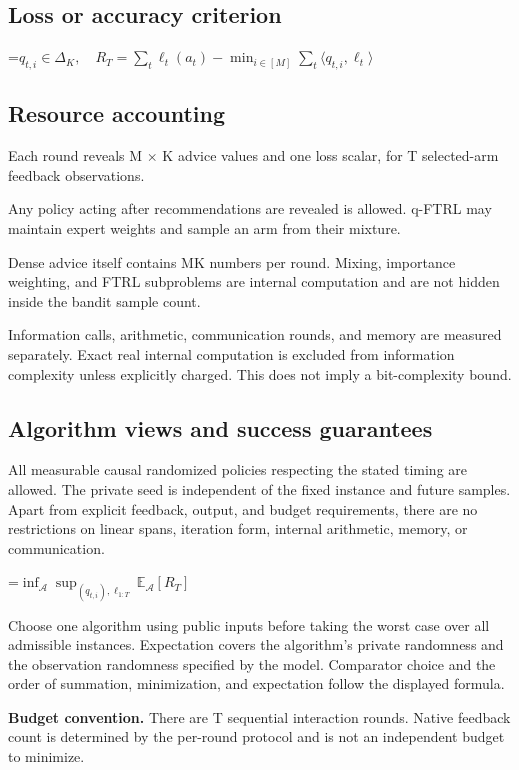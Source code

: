 \documentclass[10pt,a4paper]{article}
\newcommand{\AtlasMath}[1]{\par\begingroup\centering\setbox0=\hbox{$\displaystyle #1$}\ifdim\wd0>1.4\linewidth\typeout{ATLAS WIDE FORMULA: \the\wd0}\fi\ifdim\wd0>\linewidth\resizebox{\linewidth}{!}{\box0}\else\box0\fi\par\endgroup}
\begin{document}
\subsection{Loss or accuracy criterion}

\AtlasMath{q_{t,i}\in\Delta_K,\quad R_T=\sum_t\ell_t(a_t)-\min_{i\in[M]}\sum_t\langle q_{t,i},\ell_t\rangle}


\subsection{Resource accounting}
Each round reveals M $\times$ K advice values and one loss scalar, for T selected-arm feedback observations.

Any policy acting after recommendations are revealed is allowed. q-FTRL may maintain expert weights and sample an arm from their mixture.

Dense advice itself contains MK numbers per round. Mixing, importance weighting, and FTRL subproblems are internal computation and are not hidden inside the bandit sample count.

Information calls, arithmetic, communication rounds, and memory are measured separately. Exact real internal computation is excluded from information complexity unless explicitly charged. This does not imply a bit-complexity bound.

\subsection{Algorithm views and success guarantees}
All measurable causal randomized policies respecting the stated timing are allowed. The private seed is independent of the fixed instance and future samples. Apart from explicit feedback, output, and budget requirements, there are no restrictions on linear spans, iteration form, internal arithmetic, memory, or communication.


\AtlasMath{\inf_{\mathcal{A}}\sup_{(q_{t,i}),\ell_{1:T}}\mathbb{E}_{\mathcal{A}}[R_T]}


Choose one algorithm using public inputs before taking the worst case over all admissible instances. Expectation covers the algorithm's private randomness and the observation randomness specified by the model. Comparator choice and the order of summation, minimization, and expectation follow the displayed formula.

\textbf{Budget convention.} There are T sequential interaction rounds. Native feedback count is determined by the per-round protocol and is not an independent budget to minimize.
\end{document}
